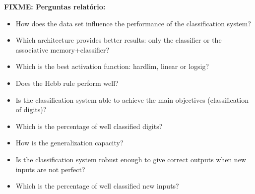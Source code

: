\documentclass{article}
\begin{document}
\vspace{.3cm}

\textbf{FIXME: Perguntas relatório:}

\begin{itemize}
\item How does the data set influence the performance of the classification system?

\item Which architecture provides better results: only the classifier or the associative memory+classifier?

\item Which is the best activation function: hardlim, linear or logsig?

\item Does the Hebb rule perform well?

\item Is the classification system able to achieve the main objectives (classification of digits)?

\item Which is the percentage of well classified digits?

\item How is the generalization capacity?

\item Is the classification system robust enough to give correct outputs when new inputs are not perfect?

\item Which is the percentage of well classified new inputs?
\end{itemize}

\pagebreak
\end{document}
